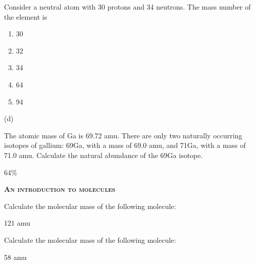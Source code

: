 \documentclass[main.tex]{subfiles}
\begin{document}
\begin{multicols*}{2}
\begin{question}[ID=15]
Consider a neutral atom with 30 protons and 34 neutrons. The mass number of the element is
\begin{multicols}{1}
  \noindent
  \begin{enumerate} [topsep=0pt, partopsep=1pt, label=(\alph*), leftmargin=1cm]
\item 30
\item 32
\item 34
\item  64
\item 94
\end{enumerate}
\end{multicols}    
\end{question}
\begin{solution}
(d)
\hspace{0.1cm}\end{solution}



\begin{question}[ID=16]
The atomic mass of Ga is 69.72 amu. There are only two naturally occurring isotopes of gallium: 69Ga, with a mass of 69.0 amu, and 71Ga, with a mass of 71.0 amu. Calculate the natural abundance of the 69Ga isotope. 
\end{question}
\begin{solution}
64\%
\hspace{0.1cm}\end{solution}


{\raggedright\textsc{\textbf{An introduction to molecules }}\par}

\begin{question}[ID=17]
Calculate the molecular mass of the following molecule: 
\end{question}
\begin{solution}
121 amu
\hspace{0.1cm}\end{solution}

\begin{question}[ID=18]
Calculate the molecular mass of the following molecule: 
\end{question}
\begin{solution}
58 amu
\hspace{0.1cm}\end{solution}



\end{multicols*}
\end{document}
